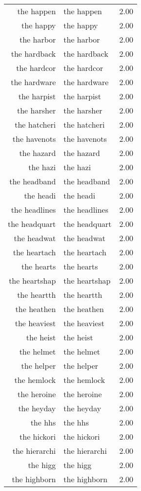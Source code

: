 \begin{table}[ht]
\begin{tabular}{rlr}
  the happen & the happen & 2.00 \\ 
  the happy & the happy & 2.00 \\ 
  the harbor & the harbor & 2.00 \\ 
  the hardback & the hardback & 2.00 \\ 
  the hardcor & the hardcor & 2.00 \\ 
  the hardware & the hardware & 2.00 \\ 
  the harpist & the harpist & 2.00 \\ 
  the harsher & the harsher & 2.00 \\ 
  the hatcheri & the hatcheri & 2.00 \\ 
  the havenots & the havenots & 2.00 \\ 
  the hazard & the hazard & 2.00 \\ 
  the hazi & the hazi & 2.00 \\ 
  the headband & the headband & 2.00 \\ 
  the headi & the headi & 2.00 \\ 
  the headlines & the headlines & 2.00 \\ 
  the headquart & the headquart & 2.00 \\ 
  the headwat & the headwat & 2.00 \\ 
  the heartach & the heartach & 2.00 \\ 
  the hearts & the hearts & 2.00 \\ 
  the heartshap & the heartshap & 2.00 \\ 
  the heartth & the heartth & 2.00 \\ 
  the heathen & the heathen & 2.00 \\ 
  the heaviest & the heaviest & 2.00 \\ 
  the heist & the heist & 2.00 \\ 
  the helmet & the helmet & 2.00 \\ 
  the helper & the helper & 2.00 \\ 
  the hemlock & the hemlock & 2.00 \\ 
  the heroine & the heroine & 2.00 \\ 
  the heyday & the heyday & 2.00 \\ 
  the hhs & the hhs & 2.00 \\ 
  the hickori & the hickori & 2.00 \\ 
  the hierarchi & the hierarchi & 2.00 \\ 
  the higg & the higg & 2.00 \\ 
  the highborn & the highborn & 2.00 \\ 

\end{tabular}
\end{table}
